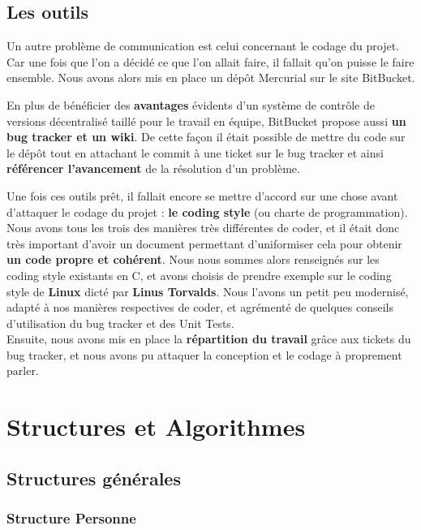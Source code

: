 \documentclass[a4paper, titlepage, oneside]{book}
\begin{document}
\section{Les outils}

Un autre problème de communication est celui concernant le codage du projet. Car une fois que l'on a décidé ce que l'on allait faire, il fallait qu'on puisse le faire ensemble. Nous avons alors mis en place un dépôt Mercurial sur le site BitBucket.

En plus de bénéficier des \textbf{avantages} évidents d'un système de contrôle de versions décentralisé taillé pour le travail en équipe, BitBucket propose aussi \textbf{un bug tracker et un wiki}. De cette façon il était possible de mettre du code sur le dépôt tout en attachant le commit à une ticket sur le bug tracker et ainsi \textbf{référencer l'avancement} de la résolution d'un problème.

Une fois ces outils prêt, il fallait encore se mettre d'accord sur une chose avant d'attaquer le codage du projet : \textbf{le coding style} (ou charte de programmation). Nous avons tous les trois des manières très différentes de coder, et il était donc très important d'avoir un document permettant d'uniformiser cela pour obtenir \textbf{un code propre et cohérent}. Nous nous sommes alors renseignés sur les coding style existants en C, et avons choisis de prendre exemple sur le coding style de \textbf{Linux} dicté par \textbf{Linus Torvalds}. Nous l'avons un petit peu modernisé, adapté à nos manières respectives de coder, et agrémenté de quelques conseils d'utilisation du bug tracker et des Unit Tests.\\
Ensuite, nous avons mis en place la \textbf{répartition du travail} grâce aux tickets du bug tracker, et nous avons pu attaquer la conception et le codage à proprement parler.

\chapter{Structures et Algorithmes}

\section{Structures générales}

\subsection{Structure Personne}
	
\end{document}
